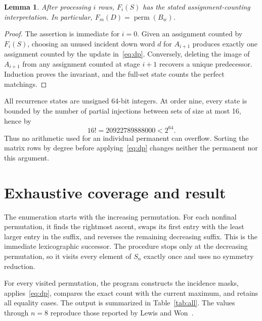 \documentclass[11pt]{article}
\newtheorem{lemma}{Lemma}
\newcommand{\perm}{\operatorname{perm}}
\begin{document}
\begin{lemma}\label{lem:exact}
After processing $i$ rows, $F_i(S)$ has the stated assignment-counting
interpretation.  In particular, $F_m(D)=\perm(B_w)$.
\end{lemma}

\begin{proof}
The assertion is immediate for $i=0$.  Given an assignment counted by
$F_i(S)$, choosing an unused incident down word $d$ for $A_{i+1}$ produces
exactly one assignment counted by the update in~\eqref{eq:dp}.  Conversely,
deleting the image of $A_{i+1}$ from any assignment counted at stage $i+1$
recovers a unique predecessor.  Induction proves the invariant, and the
full-set state counts the perfect matchings.
\end{proof}

All recurrence states are unsigned 64-bit integers.  At order nine, every
state is bounded by the number of partial injections between sets of size at
most 16, hence by
\[
  16!=20922789888000<2^{64}.
\]
Thus no arithmetic used for an individual permanent can overflow.  Sorting
the matrix rows by degree before applying~\eqref{eq:dp} changes neither the
permanent nor this argument.

\section{Exhaustive coverage and result}

The enumeration starts with the increasing permutation.  For each
nonfinal permutation, it finds the rightmost ascent, swaps its first entry
with the least larger entry in the suffix, and reverses the remaining
decreasing suffix.  This is the immediate lexicographic successor.  The
procedure stops only at the decreasing permutation, so it visits every
element of $S_n$ exactly once and uses no symmetry reduction.

For every visited permutation, the program constructs the incidence masks,
applies~\eqref{eq:dp}, compares the exact count with the current maximum, and
retains all equality cases.  The output is summarized in Table~\ref{tab:all}.
The values through $n=8$ reproduce those reported by Lewis and
Won~\cite[Section~3.4]{LewisWon2026}.
\end{document}
